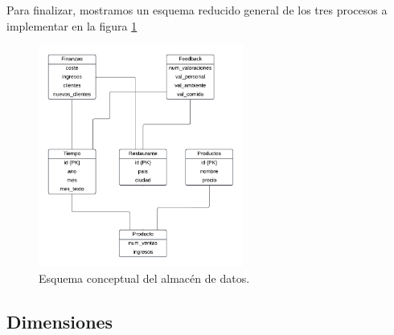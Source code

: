 \documentclass[12pt]{opticajnl}
\begin{document}
Para finalizar, mostramos un esquema reducido general de los tres procesos a implementar en la figura \ref{fig:esquema_almacen}

\begin{figure}[H]
\centering
\includegraphics[width=0.6\textwidth]{fotos/3.pdf}
\caption{Esquema conceptual del almacén de datos.}
\label{fig:esquema_almacen}
\end{figure}


\subsection{Dimensiones} \label{sec:3b}
\end{document}
